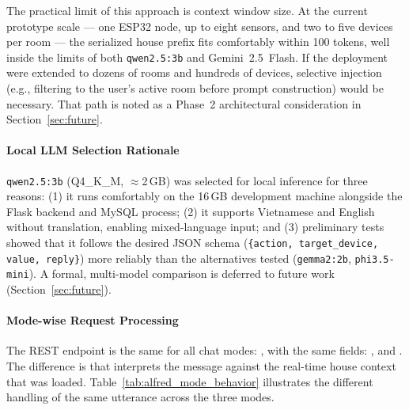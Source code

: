 The practical limit of this approach is context window size. At the current prototype scale --- one ESP32 node, up to eight sensors, and two to five devices per room --- the serialized house prefix fits comfortably within 100 tokens, well inside the limits of both \texttt{qwen2.5:3b} and Gemini~2.5~Flash. If the deployment were extended to dozens of rooms and hundreds of devices, selective injection (e.g., filtering to the user's active room before prompt construction) would be necessary. That path is noted as a Phase~2 architectural consideration in Section~\ref{sec:future}.

\paragraph{Local LLM Selection Rationale}
\label{subsec:llm_selection}

\texttt{qwen2.5:3b} (Q4\_K\_M, $\approx$2\,GB) was selected for local inference for three reasons: (1) it runs comfortably on the 16\,GB development machine alongside the Flask backend and MySQL process; (2) it supports Vietnamese and English without translation, enabling mixed-language input; and (3) preliminary tests showed that it follows the desired JSON schema (\texttt{\{action, target\_device, value, reply\}}) more reliably than the alternatives tested (\texttt{gemma2:2b}, \texttt{phi3.5-mini}). A formal, multi-model comparison is deferred to future work (Section~\ref{sec:future}).

\paragraph{Mode-wise Request Processing}

The REST endpoint is the same for all chat modes: , with the same fields: ,  and . The difference is that  interprets the message against the real-time house context that was loaded. Table~\ref{tab:alfred_mode_behavior} illustrates the different handling of the same utterance across the three modes.

